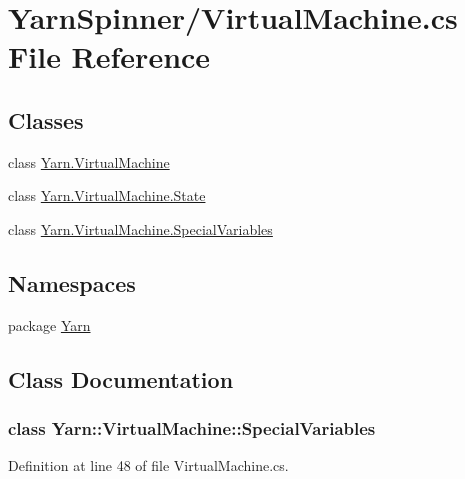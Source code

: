 \hypertarget{a00298}{\section{Yarn\-Spinner/\-Virtual\-Machine.cs File Reference}
\label{a00298}
}
\subsection*{Classes}
\begin{DoxyCompactItemize}
\item 
class \hyperlink{a00152}{Yarn.\-Virtual\-Machine}
\item 
class \hyperlink{a00155}{Yarn.\-Virtual\-Machine.\-State}
\item 
class \hyperlink{a00152_a00363}{Yarn.\-Virtual\-Machine.\-Special\-Variables}
\end{DoxyCompactItemize}
\subsection*{Namespaces}
\begin{DoxyCompactItemize}
\item 
package \hyperlink{a00041}{Yarn}
\end{DoxyCompactItemize}


\subsection{Class Documentation}
\label{a00363}
\hypertarget{a00152_a00363}{}
\subsubsection{class Yarn\-:\-:Virtual\-Machine\-:\-:Special\-Variables}


Definition at line 48 of file Virtual\-Machine.\-cs.



